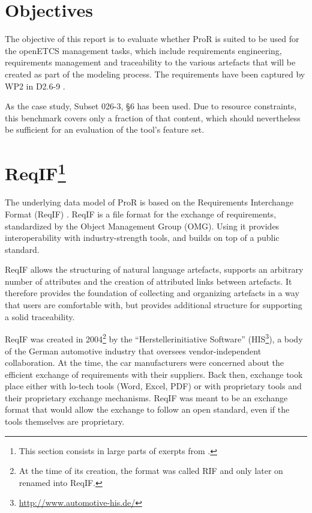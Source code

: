 \documentclass{template/openetcs_report}
\begin{document}
\section{Objectives}

The objective of this report is to evaluate whether ProR is suited to be used for the openETCS management tasks, which include requirements engineering, requirements management and traceability to the various artefacts that will be created as part of the modeling process.  The requirements have been captured by WP2 in D2.6-9 \cite{D2.6-9}.  

As the case study, Subset 026-3, §6 \cite{subset026-6} has been used.  Due to resource constraints, this benchmark covers only a fraction of that content, which should nevertheless be sufficient for an evaluation of the tool's feature set.

\section{ReqIF\footnote{This section consists in large parts of exerpts from \cite{RMF_Mark_Book_Jastram_2013}.}}

The underlying data model of ProR is based on the Requirements Interchange Format (ReqIF) \cite{omg_requirements_2011}.  ReqIF is a file format for the exchange of requirements, standardized by the Object Management Group (OMG).  Using it provides interoperability with industry-strength tools, and builds on top of a public standard.

ReqIF allows the structuring of natural language artefacts, supports an arbitrary number of attributes and the creation of attributed links between artefacts.  It therefore provides the foundation of collecting and organizing artefacts in a way that users are comfortable with, but provides additional structure for supporting a solid traceability.

ReqIF was created in 2004\footnote{At the time of its creation, the format was called RIF and only later on renamed into ReqIF.} by the ``Herstellerinitiative Software'' (HIS\footnote{\url{http://www.automotive-his.de/}}), a body of the German automotive industry that oversees vendor-independent collaboration.  At the time, the car manufacturers were concerned about the efficient exchange of requirements with their suppliers.  Back then, exchange took place either with lo-tech tools (Word, Excel, PDF) or with proprietary tools and their proprietary exchange mechanisms.  ReqIF was meant to be an exchange format that would allow the exchange to follow an open standard, even if the tools themselves are proprietary.
\end{document}
